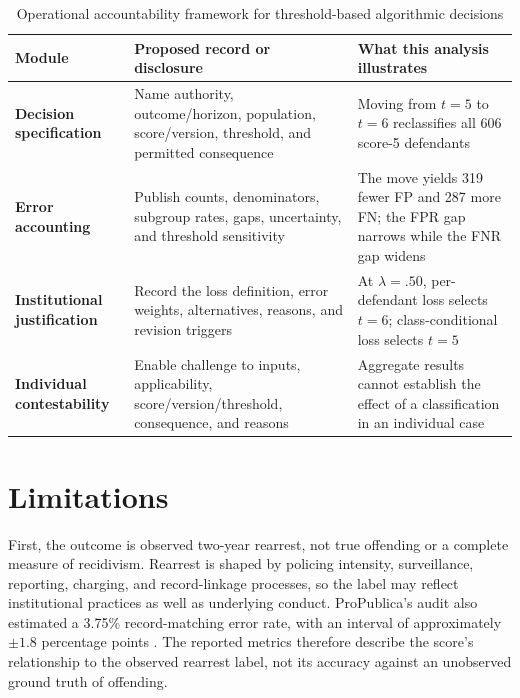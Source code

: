 \documentclass[11pt,letterpaper]{article}
\renewcommand{\arraystretch}{1.12}
\begin{document}
\begin{table}[t]
\centering
\caption{Operational accountability framework for threshold-based algorithmic decisions}
\label{tab:accountability-framework}
\small
\setlength{\tabcolsep}{4pt}
\renewcommand{\arraystretch}{1.16}
\begin{threeparttable}
\begin{tabular}{@{}>{\raggedright\arraybackslash}p{}>{\raggedright\arraybackslash}p{}>{\raggedright\arraybackslash}p{}@{}}
\toprule
Module & Proposed record or disclosure & What this analysis illustrates \\
\midrule
\textbf{Decision specification} & Name authority, outcome/horizon, population, score/version, threshold, and permitted consequence & Moving from $t=5$ to $t=6$ reclassifies all 606 score-5 defendants \\
\addlinespace
\textbf{Error accounting} & Publish counts, denominators, subgroup rates, gaps, uncertainty, and threshold sensitivity & The move yields 319 fewer FP and 287 more FN; the FPR gap narrows while the FNR gap widens \\
\addlinespace
\textbf{Institutional justification} & Record the loss definition, error weights, alternatives, reasons, and revision triggers & At $\lambda=.50$, per-defendant loss selects $t=6$; class-conditional loss selects $t=5$ \\
\addlinespace
\textbf{Individual contestability} & Enable challenge to inputs, applicability, score/version/threshold, consequence, and reasons & Aggregate results cannot establish the effect of a classification in an individual case \\
\bottomrule
\end{tabular}
\end{threeparttable}
\end{table}

\FloatBarrier

\section{Limitations}

First, the outcome is observed two-year rearrest, not true offending or a complete measure of recidivism. Rearrest is shaped by policing intensity, surveillance, reporting, charging, and record-linkage processes, so the label may reflect institutional practices as well as underlying conduct. ProPublica's audit also estimated a 3.75\% record-matching error rate, with an interval of approximately $\pm1.8$ percentage points \citep{larson2016}. The reported metrics therefore describe the score's relationship to the observed rearrest label, not its accuracy against an unobserved ground truth of offending.
\end{document}
